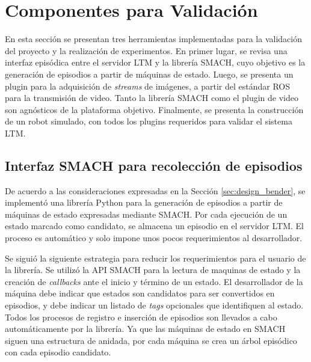 
\section{Componentes para Validación}\label{sec:impl-validation}

En esta sección se presentan tres herramientas implementadas para la validación del proyecto y la realización de experimentos. En primer lugar, se revisa una interfaz episódica entre el servidor LTM y la librería SMACH, cuyo objetivo es la generación de episodios a partir de máquinas de estado. Luego, se presenta un plugin para la adquisición de \textit{streams} de imágenes, a partir del estándar ROS para la transmisión de video. Tanto la librería SMACH como el plugin de video son agnósticos de la plataforma objetivo. Finalmente, se presenta la construcción de un robot simulado, con todos los plugins requeridos para validar el sistema LTM. 

\subsection{Interfaz SMACH para recolección de episodios}

De acuerdo a las consideraciones expresadas en la Sección \ref{sec:design_bender}, se implementó una librería Python para la generación de episodios a partir de máquinas de estado expresadas mediante SMACH. Por cada ejecución de un estado marcado como candidato, se almacena un episodio en el servidor LTM. El proceso es automático y solo impone unos pocos requerimientos al desarrollador.

 Se siguió la siguiente estrategia para reducir los requerimientos para el usuario de la librería. Se utilizó la API SMACH para la lectura de maquinas de estado y la creación de \textit{callbacks} ante el inicio y término de un estado. El desarrollador de la máquina debe indicar que estados son candidatos para ser convertidos en episodios, y debe indicar un listado de \textit{tags} opcionales que identifiquen al estado. Todos los procesos de registro e inserción de episodios son llevados a cabo automáticamente por la librería. Ya que las máquinas de estado en SMACH siguen una estructura de anidada, por cada máquina se crea un árbol episódico con cada episodio candidato.


